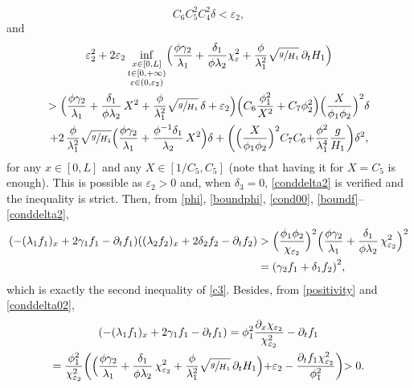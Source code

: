 \documentclass[11pt]{article}
\numberwithin{equation}{section}
\theoremstyle{definition}
\begin{document}
\begin{equation}
\label{conddelta02}
C_{6}C_{5}^{2}C_{4}^{2}\delta<\varepsilon_{2},
\end{equation}
and
\begin{multline}
\label{conddelta2}
\varepsilon_{2}^{2}+2\varepsilon_{2}\inf_{\substack{x\in[0,L]\\ t\in[0,+\infty)\\\varepsilon\in(0,\varepsilon_{2})}}\Bigl(\frac{\phi \gamma_{2}}{\lambda_{1}}+\frac{\delta_{1}}{\phi\lambda_{2}}\chi_{\varepsilon}^{2}+{\frac{\phi}{\lambda_{1}^{2}}}\sqrt{\sfrac{g}{H_{1}}}\,\partial_{t} H_{1} \Bigl)\\
> \Bigl(\frac{\phi \gamma_{2}}{\lambda_{1}}+\frac{\delta_{1}}{\phi\lambda_{2}}\,X^{2}+{\frac{\phi}{\lambda_{1}^{2}}}\sqrt{\sfrac{g}{H_{1}}}\,\delta+\varepsilon_{2} \Bigr) \Bigl(C_{6}\frac{\phi_{1}^{2}}{X^{2}}+C_{7}\phi_{2}^{2} \Bigr) \Bigl(\frac{X}{\phi_{1}\phi_{2}} \Bigr)^{2}\delta\\
+2\,\frac{\phi}{\lambda_{1}^{2}}\sqrt{\sfrac{g}{H_{1}}} \Bigl(\frac{\phi\gamma_{2}}{\lambda_{1}}+\frac{\phi^{-1}\delta_{1}}{\lambda_{2}}\,X^{2} \Bigr)\delta+\biggl(\Bigl(\frac{X}{\phi_{1}\phi_{2}} \Bigr)^{2}C_{7}C_{6}{+\frac{\phi^{2}}{\lambda_{1}^{4}}\frac{g}{H_{1}}}\biggr)\delta^{2},
\end{multline}
for any $x\in[0,L]$ and any $X\in[1/C_{5},C_{5}]$ ({note} that having it for $X=C_{5}$ is enough). This is possible as $\varepsilon_{2}>0$ and, when $\delta_{3}=0$,
\eqref{conddelta2} is verified and the inequality is strict.
Then, from \eqref{phi}, \eqref{boundphi}, \eqref{cond00}, \eqref{boundf}--\eqref{conddelta2},
\begin{equation*}
\begin{split}
(-(\lambda_{1}f_{1})_{x}+2\gamma_{1}f_{1}-\partial_{t}f_{1})((\lambda_{2}f_{2})_{x}+2\delta_{2}f_{2}-\partial_{t}f_{2})&>
\Bigl(\frac{\phi_{1}\phi_{2}}{\chi_{\varepsilon_{2}}} \Bigr)^{2} \Bigl(\frac{\phi \gamma_{2}}{\lambda_{1}}+\frac{\delta_{1}}{\phi\lambda_{2}}\,\chi_{\varepsilon_{2}}^{2} \Bigr)^{2}\\
&={\left(\gamma_{2}f_{1}+\delta_{1}f_{2}\right)^{2}},\\
\end{split}
\end{equation*}
which is exactly the second inequality of \eqref{c3}. Besides,
from \eqref{positivity} and \eqref{conddelta02},
\begin{multline*}
(-(\lambda_{1}f_{1})_{x}+2\gamma_{1}f_{1}-\partial_{t}f_{1})=\phi_{1}^{2}\frac{\partial_{x}\chi_{\varepsilon_{2}}}{\chi^{2}_{\varepsilon_{2}}}
-\partial_{t}f_{1}
\\
=\frac{\phi_{1}^{2}}{\chi_{\varepsilon_{2}}^{2}}\biggl(
\Bigl(\frac{\phi\gamma_{2}}{\lambda_{1}}+\frac{\delta_{1}}{\phi\lambda_{2}}\,{\chi}_{{\varepsilon_{2}}}^{2}+{\frac{\phi}{\lambda_{1}^{2}}}\sqrt{\sfrac{g}{H_{1}}}\,\partial_{t} H_{1} \Bigl)+{\varepsilon_{2}}
-\frac{\partial_{t}f_{1}\chi_{\varepsilon_{2}}^{2}}{\phi_{1}^{2}}
\biggl)>0.
\end{multline*}
\end{document}
